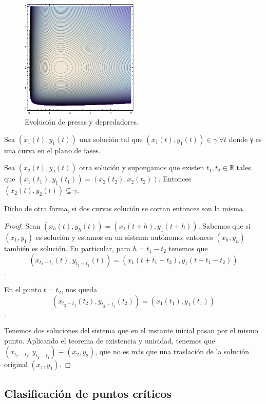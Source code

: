 \begin{figure}[hbtp]
\centering
\includegraphics[width=0.5\textwidth]{img/Poblaciones.png}
\caption{Evolución de presas y depredadores.}
\label{imgPoblaciones}
\end{figure}

\begin{theorem}
Sea $(x_1(t), y_1(t))$ una solución tal que $(x_1(t),y_1(t)) ∈ γ\; ∀t$ donde γ es una curva en el plano de fases.

Sea $(x_2(t), y_2(t))$ otra solución y supongamos que existen $t_1, t_2 ∈ ℝ$ tales que  $(x_1(t_1), y_1(t_1)) = (x_2(t_2),x_2(t_2))$. Entonces $(x_2(t), y_2(t)) ⊆ γ$.

Dicho de otra forma, si dos curvas solución se cortan entonces son la misma.
\end{theorem}

\begin{proof}
Sean $(x_h(t),y_h(t)) = (x_1(t+h), y_1(t+h))$. Sabemos que si $(x_1,y_1)$ es solución y estamos en un sistema autónomo, entonces $(x_h, y_h)$ también es solución. En particular, para $h=t_1 - t_2$ tenemos que \[ (x_{t_2 - t_1}(t),y_{t_2 - t_1}(t)) = (x_1(t+t_1-t_2),y_1(t+t_1-t_2)) \].

En el punto $t=t_2$, nos queda \[ (x_{t_2 - t_1}(t_2),y_{t_2 - t_1}(t_2)) = (x_1(t_1),y_1(t_1)) \].

Tenemos dos soluciones del sistema que en el instante inicial pasan por el mismo punto. Aplicando el teorema de existencia y unicidad, tenemos que $(x_{t_2 - t_1},y_{t_2 - t_1})\equiv (x_2,y_2)$, que no es más que una traslación de la solución original $(x_1,y_1)$.
\end{proof}

\subsection{Clasificación de puntos críticos}

